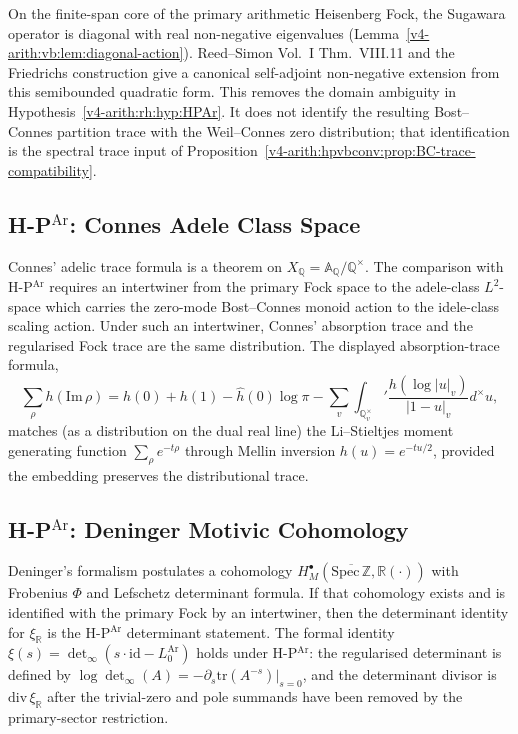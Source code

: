 On the finite-span core of the primary arithmetic Heisenberg Fock, the
Sugawara operator is diagonal with real non-negative eigenvalues
(Lemma~\ref{v4-arith:vb:lem:diagonal-action}). Reed--Simon Vol.~I
Thm.~VIII.11 and the Friedrichs construction give a canonical
self-adjoint non-negative extension from this semibounded quadratic
form. This removes the domain ambiguity in
Hypothesis~\ref{v4-arith:rh:hyp:HPAr}. It does not identify the resulting
Bost--Connes partition trace with the Weil--Connes zero distribution;
that identification is the spectral trace input of
Proposition~\ref{v4-arith:hpvbconv:prop:BC-trace-compatibility}.

\subsection{H-P\(^{\mathrm{Ar}}\): Connes Adele Class Space}
\label{v4-arith:hpvbconv:cycle-2}

Connes' adelic trace formula is a theorem on
\(X_{\mathbb{Q}}=\mathbb{A}_{\mathbb{Q}}/\mathbb{Q}^{\times}\). The
comparison with H-P\(^{\mathrm{Ar}}\) requires an intertwiner from the
primary Fock space to the adele-class \(L^{2}\)-space which carries the
zero-mode Bost--Connes monoid action to the idele-class scaling
action. Under such an intertwiner, Connes' absorption trace and the
regularised Fock trace are the same distribution. The displayed
absorption-trace formula,
\[
\sum_{\rho}h(\mathrm{Im}\,\rho)
=h(0)+h(1)-\hat{h}(0)\log\pi-\sum_{v}\int_{\mathbb{Q}_{v}^{\times}}'\frac{h(\log|u|_{v})}{|1-u|_{v}}d^{\times}u,
\]
matches (as a distribution on the dual real line) the Li--Stieltjes
moment generating function
\(\sum_{\rho}e^{-t\rho}\) through Mellin inversion
\(h(u)=e^{-tu/2}\), provided the embedding preserves the
distributional trace.

\subsection{H-P\(^{\mathrm{Ar}}\): Deninger Motivic Cohomology}
\label{v4-arith:hpvbconv:cycle-3}

Deninger's formalism postulates a cohomology
\(H^{\bullet}_{M}(\overline{\mathrm{Spec}\,\mathbb{Z}},\mathbb{R}(\cdot))\)
with Frobenius \(\Phi\) and Lefschetz determinant formula. If that
cohomology exists and is identified with the primary Fock by an
intertwiner, then the determinant identity for \(\xi_{\mathbb R}\) is
the H-P\(^{\mathrm{Ar}}\) determinant statement. The formal identity
\(\xi(s)=\det_{\infty}(s\cdot\mathrm{id}-L_{0}^{\mathrm{Ar}})\)
holds under H-P\(^{\mathrm{Ar}}\): the regularised determinant is defined by
\(\log\det_{\infty}(A)=-\partial_{s}\mathrm{tr}(A^{-s})|_{s=0}\), and
the determinant divisor is \(\mathrm{div}\,\xi_{\mathbb R}\) after the
trivial-zero and pole summands have been removed by the primary-sector
restriction.

